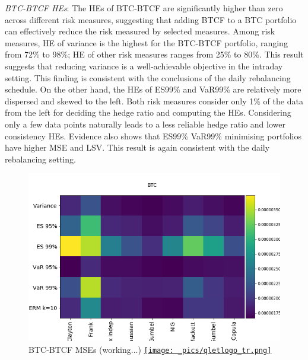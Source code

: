 \documentclass[11pt,a4paper,english]{article}
\begin{document}
\textit{BTC-BTCF HEs}: The HEs of BTC-BTCF are significantly higher than zero across different risk measures, suggesting that adding BTCF to a BTC portfolio can effectively reduce the risk measured by selected measures.
Among risk measures, HE of variance is the highest for the BTC-BTCF portfolio, ranging from 72\% to 98\%;
HE of other risk measures ranges from 25\% to 80\%.
This result suggests that reducing variance is a well-achievable objective in the intraday setting.
This finding is consistent with the conclusions of the daily rebalancing schedule. On the other hand, the HEs of ES99\% and VaR99\% are relatively more dispersed and skewed to the left.
Both risk measures consider only 1\% of the data from the left for deciding the hedge ratio and computing the HEs.
Considering only a few data points naturally leads to a less reliable hedge ratio and lower consistency HEs.
Evidence also shows that ES99\% VaR99\% minimising portfolios have higher MSE and LSV.
This result is again consistent with the daily rebalancing setting.

\begin{figure}[t]
\includegraphics[width=\textwidth]{_pics/revision_BTC_MSEs.png}
  \caption{BTC-BTCF MSEs (working...)
  \href{http://www.quantlet.com/}{\texttt{[image: \_pics/qletlogo\_tr.png]}} }
\label{fig:BTC_MSE}
\end{figure}
\end{document}

